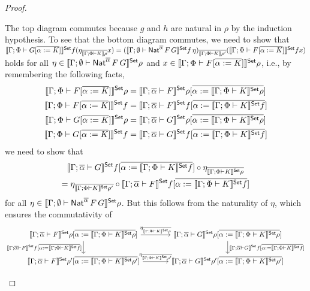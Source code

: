 \documentclass[acmsmall,review,anonymous]{acmart}
\theoremstyle{definition}
\renewcommand{\id}{\mathit{id}}
\begin{document}
\begin{proof}
\begin{itemize}
\noindent
The top diagram commutes because $g$ and $h$ are natural in $\rho$ by
the induction hypothesis.
To see that the bottom diagram commutes,
we need to show that
$\llbracket{\Gamma;\Phi \vdash G [\overline{\alpha := K}]}\rrbracket^{\mathsf{Set}} f
(\eta_{\overline{\llbracket{\Gamma;\Phi \vdash K}\rrbracket\rho}} x) =
(\llbracket{\Gamma; \emptyset \vdash \mathsf{Nat}^{\overline{\alpha}} \,F \,G}\rrbracket^{\mathsf{Set}} f\, \eta
)_{\overline{\llbracket{\Gamma;\Phi \vdash K}\rrbracket\rho'}}
(\llbracket{\Gamma;\Phi \vdash F [\overline{\alpha := K}]}\rrbracket^{\mathsf{Set}} f x)$
holds for all $\eta \in \llbracket{\Gamma; \emptyset \vdash
  \mathsf{Nat}^{\overline{\alpha}} \,F \,G}\rrbracket^{\mathsf{Set}}\rho$ and $x \in
\llbracket{\Gamma;\Phi \vdash F [\overline{\alpha := K}]}\rrbracket^{\mathsf{Set}}\rho$,
i.e.,
by remembering the following facts,
\begin{align*}
\llbracket{\Gamma;\Phi \vdash F[\overline{\alpha := K}]}\rrbracket^{\mathsf{Set}}\rho
&= \llbracket{\Gamma; \overline{\alpha} \vdash F}\rrbracket^{\mathsf{Set}}\rho[\overline{\alpha :=
    \llbracket{\Gamma;\Phi \vdash K}\rrbracket^{\mathsf{Set}}\rho}] \\
\llbracket{\Gamma;\Phi \vdash F[\overline{\alpha := K}]}\rrbracket^{\mathsf{Set}} f
&= \llbracket{\Gamma; \overline{\alpha} \vdash F}\rrbracket^{\mathsf{Set}}
  f [\overline{\alpha := \llbracket{\Gamma;\Phi \vdash K}\rrbracket^{\mathsf{Set}} f}] \\
\llbracket{\Gamma;\Phi \vdash G[\overline{\alpha := K}]}\rrbracket^{\mathsf{Set}}\rho
&= \llbracket{\Gamma; \overline{\alpha} \vdash G}\rrbracket^{\mathsf{Set}}\rho[\overline{\alpha :=
    \llbracket{\Gamma;\Phi \vdash K}\rrbracket^{\mathsf{Set}}\rho}] \\
\llbracket{\Gamma;\Phi \vdash G[\overline{\alpha := K}]}\rrbracket^{\mathsf{Set}} f
&= \llbracket{\Gamma; \overline{\alpha} \vdash
  G}\rrbracket^{\mathsf{Set}} f [\overline{\alpha := \llbracket{\Gamma;\Phi \vdash K}\rrbracket^{\mathsf{Set}} f}]
\end{align*}
we need to show that
\begin{multline*}
\llbracket{\Gamma; \overline{\alpha} \vdash G}\rrbracket^{\mathsf{Set}} f[\overline{\alpha := \llbracket{\Gamma;\Phi \vdash K}\rrbracket^{\mathsf{Set}} f }]
  \circ
\eta_{\overline{\llbracket{\Gamma;\Phi \vdash K}\rrbracket^{\mathsf{Set}}\rho}} \\
=
\eta_{\overline{\llbracket{\Gamma;\Phi \vdash K}\rrbracket^{\mathsf{Set}}\rho'}}
\circ
\llbracket{\Gamma; \overline{\alpha} \vdash F}\rrbracket^{\mathsf{Set}} f [\overline{\alpha := \llbracket{\Gamma;\Phi \vdash K}\rrbracket^{\mathsf{Set}} f}]
\end{multline*}
for all $\eta \in \llbracket{\Gamma;\emptyset \vdash
  \mathsf{Nat}^{\overline{\alpha}} \,F \,G}\rrbracket^{\mathsf{Set}}\rho$.
But this follows from the naturality of $\eta$, which ensures the commutativity of
{\footnotesize
\[\begin{tikzcd}[column sep = large]
\setsem{\Gamma; \ol{\alpha} \vdash F}\rho[\ol{\alpha :=
    \setsem{\Gamma;\Phi \vdash K}\rho}] \ar[r,
  "{\;\;\;\eta_{\ol{\setsem{\Gamma;\Phi \vdash K}\rho}}\;\;\; }"]
\ar[d, "{\setsem{\Gamma; \ol{\alpha} \vdash F} f [\ol{\alpha := 
        \setsem{\Gamma;\Phi \vdash K}f}]}"']
& \setsem{\Gamma;
  \ol{\alpha} \vdash G}\rho[\ol{\alpha := \setsem{\Gamma;\Phi \vdash
      K}\rho}]
\ar[d, "{\setsem{\Gamma; \ol{\alpha} \vdash G} f [\ol{\alpha := 
        \setsem{\Gamma;\Phi \vdash K}f}]}"]\\
\setsem{\Gamma; \ol{\alpha} \vdash F}\rho'[\ol{\alpha :=
    \setsem{\Gamma;\Phi \vdash K}\rho'}] \ar[r,
  "{\eta_{\ol{\setsem{\Gamma;\Phi \vdash K}\rho'}} }"]
& \setsem{\Gamma; \ol{\alpha} \vdash G}\rho'[\ol{\alpha :=
    \setsem{\Gamma;\Phi \vdash K}\rho'}]
\end{tikzcd}\]}


\end{itemize}
\end{proof}
\end{document}
